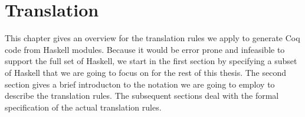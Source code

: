 \chapter{Translation} \label{chp:translation}

This chapter gives an overview for the translation rules we apply to generate Coq code from Haskell modules.
Because it would be error prone and infeasible to support the full set of Haskell, we start in the first section by specifying a subset of Haskell that we are going to focus on for the rest of this thesis.
The second section gives a brief introducton to the notation we are going to employ to describe the translation rules.
The subsequent sections deal with the formal specification of the actual translation rules.







